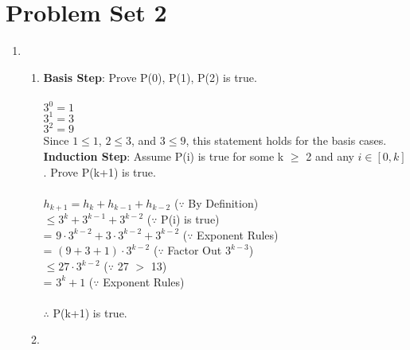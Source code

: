 \documentclass[12pt]{article}
\begin{document}
\section*{Problem Set 2}
\begin{enumerate}[label = (\alph*)]
    \item 
        \begin{enumerate}[label = \alph*.]
            \item

                \textbf{Basis Step}: Prove P(0), P(1), P(2) is true. \\
                \\
                $3^0 = 1$ \\
                $3^1 = 3$ \\
                $3^2 = 9$
                \\
                Since $1 \leq 1$, $2 \leq 3$, and $3 \leq 9$, this statement holds for the
                basis cases.
                \\
                \textbf{Induction Step}: Assume P(i) is true for some k $\geq$ 2 and any 
                                         $i \in [0, k]$. Prove P(k+1) is true. \\
                \\
                $h_{k+1} = h_{k} + h_{k-1} + h_{k-2}$ \hspace{3em} ($\because$ By Definition) \\
                $\leq 3^{k} + 3^{k-1} + 3^{k-2}$ \hspace{4em} ($\because$ P(i) is true) \\
                = $9 \cdot 3^{k-2} + 3 \cdot 3^{k-2} + 3^{k-2}$ \hspace{3em} ($\because$ Exponent Rules) \\
                = $(9+3+1) \cdot 3^{k-2}$ \hspace{5em} ($\because$ Factor Out $3^{k-3}$) \\
                $\leq 27 \cdot 3^{k-2}$ \hspace{8em} ($\because$ 27 $>$ 13) \\
                = $3^k+1$ \hspace{10em} ($\because$ Exponent Rules) \\
                \\
                $\therefore$ P(k+1) is true.

            \item 


\end{enumerate}
\end{enumerate}
\end{document}
